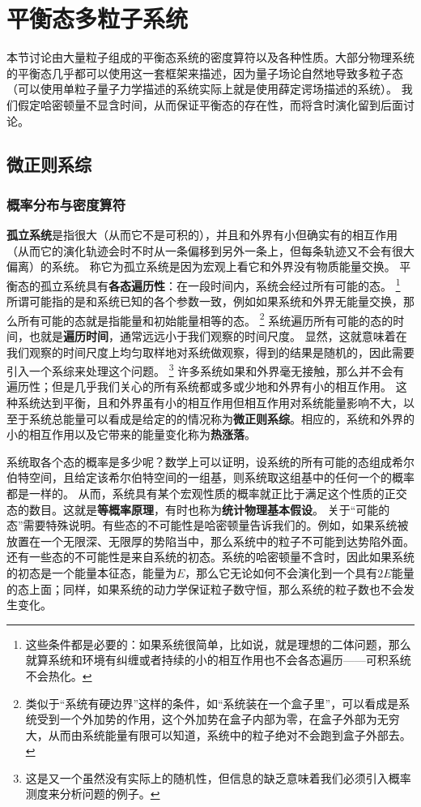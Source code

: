 \documentclass[hyperref, UTF8, a4paper]{ctexart}
\begin{document}
\section{平衡态多粒子系统}\label{sec:equilibrium-system}

本节讨论由大量粒子组成的平衡态系统的密度算符以及各种性质。大部分物理系统的平衡态几乎都可以使用这一套框架来描述，因为量子场论自然地导致多粒子态（可以使用单粒子量子力学描述的系统实际上就是使用薛定谔场描述的系统）。
我们假定哈密顿量不显含时间，从而保证平衡态的存在性，而将含时演化留到后面讨论。

\subsection{微正则系综}

\subsubsection{概率分布与密度算符}

\textbf{孤立系统}是指很大（从而它不是可积的），并且和外界有小但确实有的相互作用（从而它的演化轨迹会时不时从一条偏移到另外一条上，但每条轨迹又不会有很大偏离）的系统。
称它为孤立系统是因为宏观上看它和外界没有物质能量交换。
平衡态的孤立系统具有\textbf{各态遍历性}：在一段时间内，系统会经过所有可能的态。%
\footnote{这些条件都是必要的：如果系统很简单，比如说，就是理想的二体问题，那么就算系统和环境有纠缠或者持续的小的相互作用也不会各态遍历——可积系统不会热化。}%
所谓可能指的是和系统已知的各个参数一致，例如如果系统和外界无能量交换，那么所有可能的态就是指能量和初始能量相等的态。%
\footnote{类似于“系统有硬边界”这样的条件，如“系统装在一个盒子里”，可以看成是系统受到一个外加势的作用，这个外加势在盒子内部为零，在盒子外部为无穷大，从而由系统能量有限可以知道，系统中的粒子绝对不会跑到盒子外部去。}%
系统遍历所有可能的态的时间，也就是\textbf{遍历时间}，通常远远小于我们观察的时间尺度。
显然，这就意味着在我们观察的时间尺度上均匀取样地对系统做观察，得到的结果是随机的，因此需要引入一个系综来处理这个问题。%
\footnote{这是又一个虽然没有实际上的随机性，但信息的缺乏意味着我们必须引入概率测度来分析问题的例子。}%
许多系统如果和外界毫无接触，那么并不会有遍历性；但是几乎我们关心的所有系统都或多或少地和外界有小的相互作用。
这种系统达到平衡，且和外界虽有小的相互作用但相互作用对系统能量影响不大，以至于系统总能量可以看成是给定的的情况称为\textbf{微正则系综}。相应的，系统和外界的小的相互作用以及它带来的能量变化称为\textbf{热涨落}。

系统取各个态的概率是多少呢？数学上可以证明，设系统的所有可能的态组成希尔伯特空间，且给定该希尔伯特空间的一组基，则系统取这组基中的任何一个的概率都是一样的。
从而，系统具有某个宏观性质的概率就正比于满足这个性质的正交态的数目。这就是\textbf{等概率原理}，有时也称为\textbf{统计物理基本假设}。
关于“可能的态”需要特殊说明。有些态的不可能性是哈密顿量告诉我们的。例如，如果系统被放置在一个无限深、无限厚的势陷当中，那么系统中的粒子不可能到达势陷外面。还有一些态的不可能性是来自系统的初态。系统的哈密顿量不含时，因此如果系统的初态是一个能量本征态，能量为$E$，那么它无论如何不会演化到一个具有$2E$能量的态上面；同样，如果系统的动力学保证粒子数守恒，那么系统的粒子数也不会发生变化。
\end{document}

